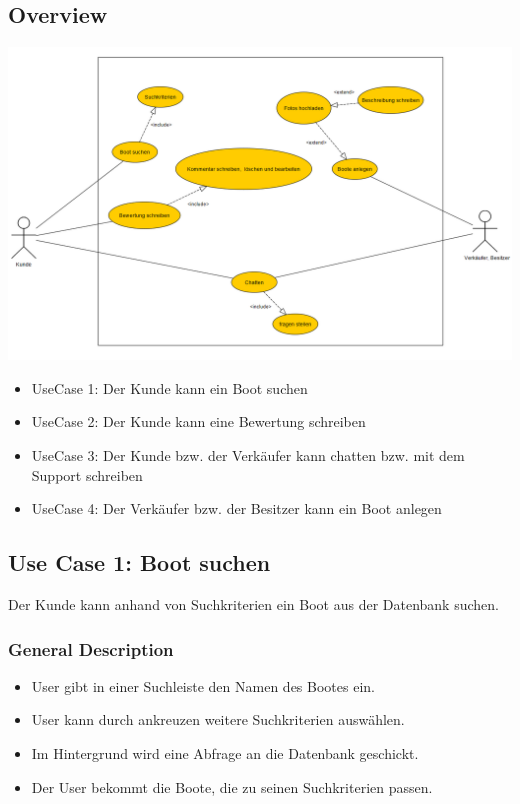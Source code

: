 \documentclass[12pt]{article}
\theoremstyle{definition}
\begin{document}
\subsection{Overview}
	\includegraphics[height=0.50\textwidth]{UseCaseDiagram.PNG}
	\begin{itemize}
		\item UseCase 1: Der Kunde kann ein Boot suchen
		\item UseCase 2: Der Kunde kann eine Bewertung schreiben
		\item UseCase 3: Der Kunde bzw. der Verkäufer kann chatten bzw. mit dem Support schreiben
		\item UseCase 4: Der Verkäufer bzw. der Besitzer kann ein Boot anlegen 
	\end{itemize}

\subsection{Use Case 1: Boot suchen}
Der Kunde kann anhand von Suchkriterien ein Boot aus der Datenbank suchen.
\subsubsection{General Description}
	\begin{itemize}
		\item User gibt in einer Suchleiste den Namen des Bootes ein.
		\item User kann durch ankreuzen weitere Suchkriterien auswählen.
		\item Im Hintergrund wird eine Abfrage an die Datenbank geschickt.
		\item Der User bekommt die Boote, die zu seinen Suchkriterien passen.
	\end{itemize}
\end{document}
